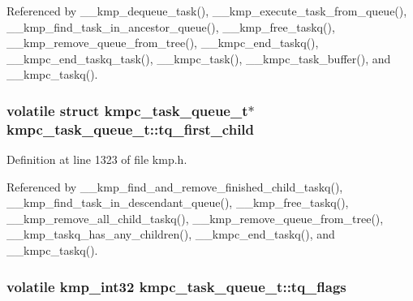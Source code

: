 Referenced by \-\_\-\-\_\-kmp\-\_\-dequeue\-\_\-task(), \-\_\-\-\_\-kmp\-\_\-execute\-\_\-task\-\_\-from\-\_\-queue(), \-\_\-\-\_\-kmp\-\_\-find\-\_\-task\-\_\-in\-\_\-ancestor\-\_\-queue(), \-\_\-\-\_\-kmp\-\_\-free\-\_\-taskq(), \-\_\-\-\_\-kmp\-\_\-remove\-\_\-queue\-\_\-from\-\_\-tree(), \-\_\-\-\_\-kmpc\-\_\-end\-\_\-taskq(), \-\_\-\-\_\-kmpc\-\_\-end\-\_\-taskq\-\_\-task(), \-\_\-\-\_\-kmpc\-\_\-task(), \-\_\-\-\_\-kmpc\-\_\-task\-\_\-buffer(), and \-\_\-\-\_\-kmpc\-\_\-taskq().

\hypertarget{structkmpc__task__queue__t_ada01d183c36f9a0ed158c8f354c78aa3}{
\subsubsection[{tq\-\_\-first\-\_\-child}]{\setlength{\rightskip}{0pt plus 5cm}volatile struct {\bf kmpc\-\_\-task\-\_\-queue\-\_\-t}$\ast$ kmpc\-\_\-task\-\_\-queue\-\_\-t\-::tq\-\_\-first\-\_\-child}}\label{structkmpc__task__queue__t_ada01d183c36f9a0ed158c8f354c78aa3}


Definition at line 1323 of file kmp.\-h.



Referenced by \-\_\-\-\_\-kmp\-\_\-find\-\_\-and\-\_\-remove\-\_\-finished\-\_\-child\-\_\-taskq(), \-\_\-\-\_\-kmp\-\_\-find\-\_\-task\-\_\-in\-\_\-descendant\-\_\-queue(), \-\_\-\-\_\-kmp\-\_\-free\-\_\-taskq(), \-\_\-\-\_\-kmp\-\_\-remove\-\_\-all\-\_\-child\-\_\-taskq(), \-\_\-\-\_\-kmp\-\_\-remove\-\_\-queue\-\_\-from\-\_\-tree(), \-\_\-\-\_\-kmp\-\_\-taskq\-\_\-has\-\_\-any\-\_\-children(), \-\_\-\-\_\-kmpc\-\_\-end\-\_\-taskq(), and \-\_\-\-\_\-kmpc\-\_\-taskq().

\hypertarget{structkmpc__task__queue__t_aa9d9f58c9c437c40f115139fd3e39ef3}{
\subsubsection[{tq\-\_\-flags}]{\setlength{\rightskip}{0pt plus 5cm}volatile kmp\-\_\-int32 kmpc\-\_\-task\-\_\-queue\-\_\-t\-::tq\-\_\-flags}}\label{structkmpc__task__queue__t_aa9d9f58c9c437c40f115139fd3e39ef3}


